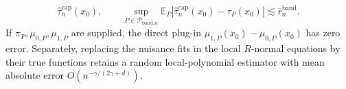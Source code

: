 \[
\widehat\tau_n^{\mathrm{cap}}(x_0),\qquad
\sup_{P\in\mathcal P_{\mathrm{band},n}}
\mathbb E_P\left|\widehat\tau_n^{\mathrm{cap}}(x_0)-\tau_P(x_0)\right|
\lesssim\overline r_n^{\mathrm{band}}.
\]
If \(\pi_P,\mu_{0,P},\mu_{1,P}\) are supplied, the direct plug-in
\(\mu_{1,P}(x_0)-\mu_{0,P}(x_0)\) has zero error.  Separately, replacing the nuisance fits in the local \(R\)-normal equations by their true functions retains a random local-polynomial estimator with mean absolute error \(O(n^{-\gamma/(2\gamma+d)})\).